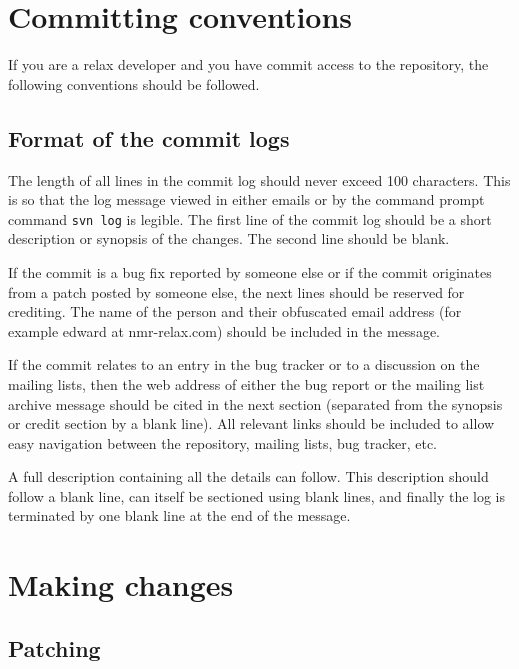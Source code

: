 
\section{Committing conventions}

If you are a relax developer and you have commit access to the repository, the following conventions should be followed.


\subsection{Format of the commit logs}

The length of all lines in the commit log should never exceed 100 characters.  This is so that the log message viewed in either emails or by the command prompt command \mbox{\texttt{svn log}} is legible.  The first line of the commit log should be a short description or synopsis of the changes.  The second line should be blank.

If the commit is a bug fix reported by someone else or if the commit originates from a patch posted by someone else, the next lines should be reserved for crediting.  The name of the person and their obfuscated email address (for example edward at nmr-relax.com) should be included in the message.

If the commit relates to an entry in the bug tracker or to a discussion on the mailing lists, then the web address of either the bug report or the mailing list archive message should be cited in the next section (separated from the synopsis or credit section by a blank line).  All relevant links should be included to allow easy navigation between the repository, mailing lists, bug tracker, etc.

A full description containing all the details can follow.  This description should follow a blank line, can itself be sectioned using blank lines, and finally the log is terminated by one blank line at the end of the message.





\section{Making changes}


\subsection{Patching}


